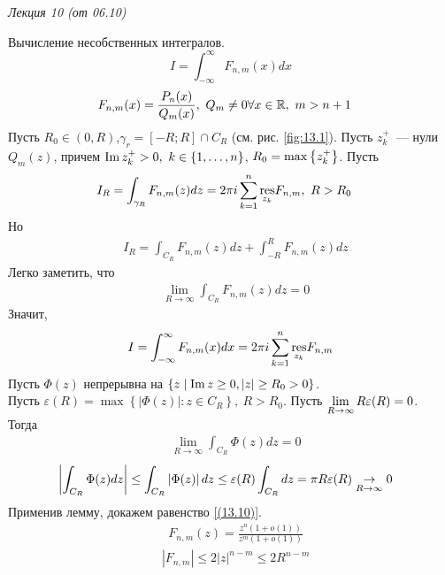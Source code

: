 \begin{flushright}
    \textit{Лекция 10 (от 06.10)}
\end{flushright}
\Example
Вычисление несобственных интегралов.
\begin{equation}\label{(13.9)}
  I = \int_{-\infty}^{\infty}F_{n,m}(x)dx
\end{equation}
\begin{align*}
  & F_{n,m}(x) = \frac{P_n(x)}{Q_m(x)}, \ Q_m \neq 0 \forall x \in \mathbb{R}, \ m > n+1
\end{align*}
Пусть $R_0 \in (0, R)$,$\gamma_r = [-R;R]\cap C_R$ (см. рис. \ref{fig:13.1}).
Пусть $z_k^+$~--- нули $Q_m(z)$, причем $\mathrm{Im}\, z_k^+ > 0, \ k \in \{1, \dots,
n\}$, $R_0 = \max \left\{{z_k^+}\right\}$. Пусть
\begin{align*}
  & I_R = \int_{\gamma_R}F_{n,m}(z)dz = 2 \pi i \sum_{k=1}^n\underset{z_k}{\mathrm{res}}F_{n,m}, \ R > R_0
\end{align*}
Но
\begin{align*}
  & I_R = \int_{C_R}F_{n,m}(z)dz + \int_{-R}^RF_{n,m}(z)dz
\end{align*}
Легко заметить, что
\begin{align*}
  & \lim_{R \to \infty} \int_{C_R}F_{n,m}(z)dz = 0
\end{align*}
Значит,
\begin{equation}\label{(13.10)}
  I = \int_{-\infty}^{\infty}F_{n,m}(x)dx = 2 \pi i \sum_{k=1}^n \underset{z_k}{\mathrm{res}} F_{n,m}
\end{equation}
\lemma
Пусть $\Phi(z)$ непрерывна на $\left\{{z \mid \mathrm{Im}\, z \geq 0, \left|{z}\right| \geq R_0 >
  0}\right\}$.
\\
Пусть $\varepsilon(R) = \max \left\{ \left| \Phi(z) \right| : z \in C_R\right\},
\ R > R_0$. Пусть $\displaystyle \lim_{R \to \infty}R\varepsilon(R) = 0$.
\\
Тогда
\begin{align*}
  & \lim_{R \to \infty }\int_{C_R}\Phi(z)dz = 0
\end{align*}
\pr
\begin{align*}
  & \left| \int_{C_R}\Phi(z)dz \right|\leq \int_{C_R}\left| \Phi(z) \right| dz \leq \varepsilon(R) \int_{C_R}dz = \pi R \varepsilon(R) \underset{R \to \infty}{\to} 0
\end{align*}
Применив лемму, докажем равенство \eqref{(13.10)}.
\begin{align*}
  & F_{n,m}(z) = \frac{z^n(1+o(1))}{z^m(1+o(1))}
\end{align*}
\begin{align*}
  & \left| F_{n,m} \right| \leq 2 \left| z \right|^{n-m} \leq 2 R^{n-m}
\end{align*}
